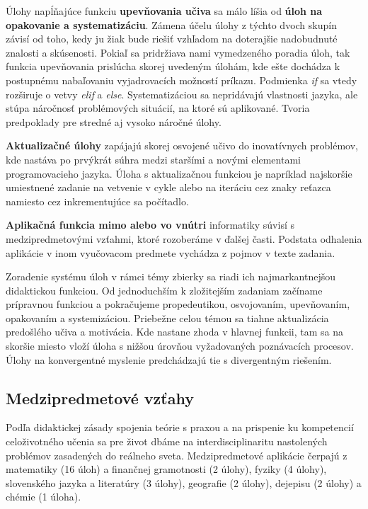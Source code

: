 Úlohy napĺňajúce funkciu \textbf{upevňovania učiva} sa málo líšia od \textbf{úloh na opakovanie a systematizáciu}. Zámena účelu úlohy z týchto dvoch skupín závisí od toho, kedy ju žiak bude riešiť vzhľadom na doterajšie nadobudnuté znalosti a skúsenosti. Pokiaľ sa pridržiava nami vymedzeného poradia úloh, tak funkcia upevňovania prislúcha skorej uvedeným úlohám, kde ešte dochádza k postupnému nabaľovaniu vyjadrovacích možností príkazu. Podmienka \emph{if} sa vtedy rozširuje o vetvy \emph{elif} a \emph{else}. Systematizáciou sa nepridávajú vlastnosti jazyka, ale stúpa náročnosť problémových situácií, na ktoré sú aplikované. Tvoria predpoklady pre stredné aj vysoko náročné úlohy.

\textbf{Aktualizačné úlohy} zapájajú skorej osvojené učivo do inovatívnych problémov, kde nastáva po prvýkrát súhra medzi staršími a novými elementami programovacieho jazyka. Úloha s aktualizačnou funkciou je napríklad najskoršie umiestnené zadanie na vetvenie v cykle alebo na iteráciu cez znaky reťazca namiesto cez inkrementujúce sa počítadlo.

\textbf{Aplikačná funkcia mimo alebo vo vnútri} informatiky súvisí s medzipredmetovými vzťahmi, ktoré rozoberáme v ďalšej časti. Podstata odhalenia aplikácie v inom vyučovacom predmete vychádza z pojmov v texte zadania.

Zoradenie systému úloh v rámci témy zbierky sa riadi ich najmarkantnejšou didaktickou funkciou. Od jednoduchším k zložitejším zadaniam začíname prípravnou funkciou a pokračujeme propedeutikou, osvojovaním, upevňovaním, opakovaním a systemizáciou. Priebežne celou témou sa tiahne aktualizácia predošlého učiva a motivácia. Kde nastane zhoda v hlavnej funkcii, tam sa na skoršie miesto vloží úloha s nižšou úrovňou vyžadovaných poznávacích procesov. Úlohy na konvergentné myslenie predchádzajú tie s divergentným riešením.

\subsection{Medzipredmetové vzťahy}
Podľa didaktickej zásady spojenia teórie s praxou a na prispenie ku kompetencií celoživotného učenia sa pre život dbáme na interdisciplinaritu nastolených problémov zasadených do reálneho sveta. Medzipredmetové aplikácie čerpajú z matematiky (16 úloh) a finančnej gramotnosti (2 úlohy), fyziky (4 úlohy), slovenského jazyka a literatúry (3 úlohy), geografie (2 úlohy), dejepisu (2 úlohy) a chémie (1 úloha).

